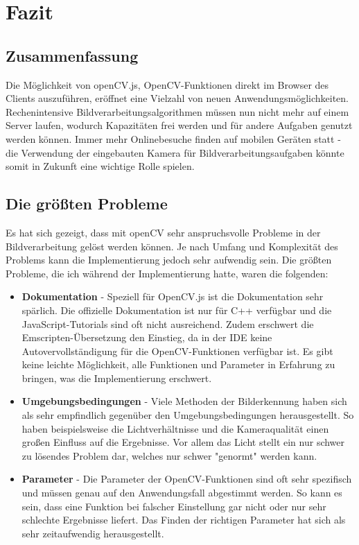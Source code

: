 \section{Fazit}

\subsection{Zusammenfassung}
Die Möglichkeit von openCV.js, OpenCV-Funktionen direkt im Browser des Clients auszuführen, eröffnet eine Vielzahl von neuen Anwendungsmöglichkeiten. Rechenintensive Bildverarbeitungsalgorithmen müssen nun nicht mehr auf einem Server laufen, wodurch Kapazitäten frei werden und für andere Aufgaben genutzt werden können. Immer mehr Onlinebesuche finden auf mobilen Geräten statt - die Verwendung der eingebauten Kamera für Bildverarbeitungsaufgaben könnte somit in Zukunft eine wichtige Rolle spielen. 

\subsection{Die größten Probleme}
Es hat sich gezeigt, dass mit openCV sehr anspruchsvolle Probleme in der Bildverarbeitung gelöst werden können. Je nach Umfang und Komplexität des Problems kann die Implementierung jedoch sehr aufwendig sein. Die größten Probleme, die ich während der Implementierung hatte, waren die folgenden:

\begin{itemize}
    \item \textbf{Dokumentation} - Speziell für OpenCV.js ist die Dokumentation sehr spärlich. Die offizielle Dokumentation ist nur für C++ verfügbar und die JavaScript-Tutorials sind oft nicht ausreichend. Zudem erschwert die Emscripten-Übersetzung den Einstieg, da in der IDE keine Autovervollständigung für die OpenCV-Funktionen verfügbar ist. Es gibt keine leichte Möglichkeit, alle Funktionen und Parameter in Erfahrung zu bringen, was die Implementierung erschwert.
    \item \textbf{Umgebungsbedingungen} - Viele Methoden der Bilderkennung haben sich als sehr empfindlich gegenüber den Umgebungsbedingungen herausgestellt. So haben beispielsweise die Lichtverhältnisse und die Kameraqualität einen großen Einfluss auf die Ergebnisse. Vor allem das Licht stellt ein nur schwer zu lösendes Problem dar, welches nur schwer "genormt" werden kann. 
    \item \textbf{Parameter} - Die Parameter der OpenCV-Funktionen sind oft sehr spezifisch und müssen genau auf den Anwendungsfall abgestimmt werden. So kann es sein, dass eine Funktion bei falscher Einstellung gar nicht oder nur sehr schlechte Ergebnisse liefert. Das Finden der richtigen Parameter hat sich als sehr zeitaufwendig herausgestellt.
\end{itemize}

